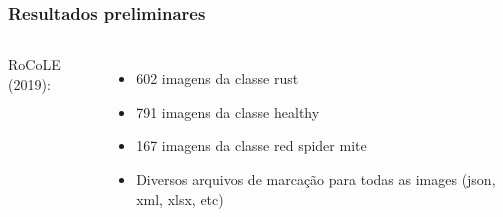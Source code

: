 \documentclass[aspectratio=169]{beamer}
\begin{document}
\begin{frame}
    \frametitle{Resultados preliminares}



    \begin{columns}




        RoCoLE (2019):
        \begin{itemize}
            \item 602 imagens da classe rust
            \item 791 imagens da classe healthy
            \item 167 imagens da classe red spider mite
            \item Diversos arquivos de marcação para todas as images (json, xml, xlsx, etc)
        \end{itemize}



\end{columns}
\end{frame}
\end{document}
